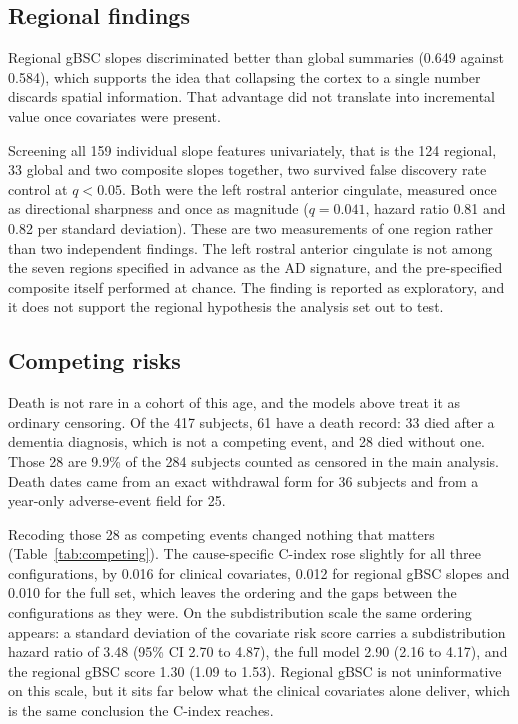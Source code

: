 \documentclass[blue]{ludusofficial}  %
\begin{document}
\subsection{Regional findings}

Regional gBSC slopes discriminated better than global summaries (0.649 against 0.584), which supports the idea that collapsing the cortex to a single number discards spatial information. That advantage did not translate into incremental value once covariates were present.

Screening all 159 individual slope features univariately, that is the 124 regional, 33 global and two composite slopes together, two survived false discovery rate control at $q<0.05$. Both were the left rostral anterior cingulate, measured once as directional sharpness and once as magnitude ($q=0.041$, hazard ratio 0.81 and 0.82 per standard deviation). These are two measurements of one region rather than two independent findings. The left rostral anterior cingulate is not among the seven regions specified in advance as the AD signature, and the pre-specified composite itself performed at chance. The finding is reported as exploratory, and it does not support the regional hypothesis the analysis set out to test.


\subsection{Competing risks}

Death is not rare in a cohort of this age, and the models above treat it as ordinary censoring. Of the 417 subjects, 61 have a death record: 33 died after a dementia diagnosis, which is not a competing event, and 28 died without one. Those 28 are 9.9\% of the 284 subjects counted as censored in the main analysis. Death dates came from an exact withdrawal form for 36 subjects and from a year-only adverse-event field for 25.

Recoding those 28 as competing events changed nothing that matters (Table~\ref{tab:competing}). The cause-specific C-index rose slightly for all three configurations, by 0.016 for clinical covariates, 0.012 for regional gBSC slopes and 0.010 for the full set, which leaves the ordering and the gaps between the configurations as they were. On the subdistribution scale the same ordering appears: a standard deviation of the covariate risk score carries a subdistribution hazard ratio of 3.48 (95\% CI 2.70 to 4.87), the full model 2.90 (2.16 to 4.17), and the regional gBSC score 1.30 (1.09 to 1.53). Regional gBSC is not uninformative on this scale, but it sits far below what the clinical covariates alone deliver, which is the same conclusion the C-index reaches.
\end{document}
